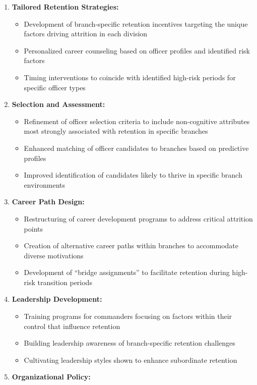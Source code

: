\documentclass[
  letterpaper,
  DIV=11,
  numbers=noendperiod]{scrartcl}
\providecommand{\tightlist}{%
  \setlength{\itemsep}{0pt}\setlength{\parskip}{0pt}}
\begin{document}
\begin{enumerate}
\def\labelenumi{\arabic{enumi}.}
\tightlist
\item
  \textbf{Tailored Retention Strategies:}

  \begin{itemize}
  \tightlist
  \item
    Development of branch-specific retention incentives targeting the
    unique factors driving attrition in each division
  \item
    Personalized career counseling based on officer profiles and
    identified risk factors
  \item
    Timing interventions to coincide with identified high-risk periods
    for specific officer types
  \end{itemize}
\item
  \textbf{Selection and Assessment:}

  \begin{itemize}
  \tightlist
  \item
    Refinement of officer selection criteria to include non-cognitive
    attributes most strongly associated with retention in specific
    branches
  \item
    Enhanced matching of officer candidates to branches based on
    predictive profiles
  \item
    Improved identification of candidates likely to thrive in specific
    branch environments
  \end{itemize}
\item
  \textbf{Career Path Design:}

  \begin{itemize}
  \tightlist
  \item
    Restructuring of career development programs to address critical
    attrition points
  \item
    Creation of alternative career paths within branches to accommodate
    diverse motivations
  \item
    Development of ``bridge assignments'' to facilitate retention during
    high-risk transition periods
  \end{itemize}
\item
  \textbf{Leadership Development:}

  \begin{itemize}
  \tightlist
  \item
    Training programs for commanders focusing on factors within their
    control that influence retention
  \item
    Building leadership awareness of branch-specific retention
    challenges
  \item
    Cultivating leadership styles shown to enhance subordinate retention
  \end{itemize}
\item
  \textbf{Organizational Policy:}


\end{enumerate}
\end{document}
